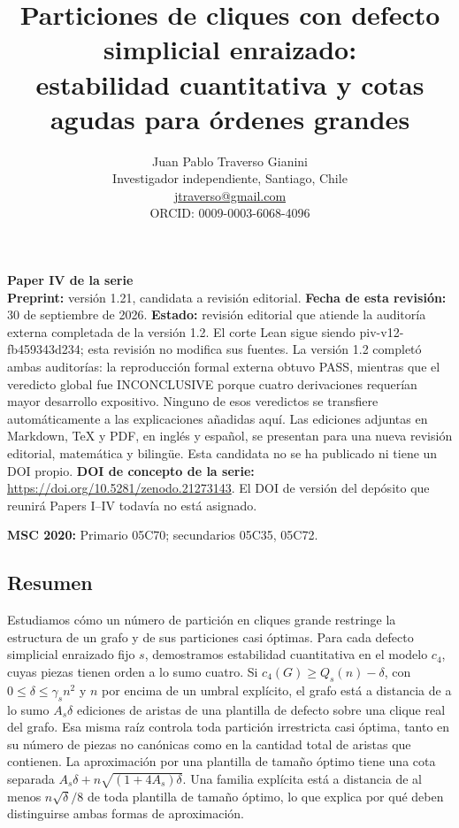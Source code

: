 \documentclass[spanish,11pt,a4paper]{article}
\title{Particiones de cliques con defecto simplicial enraizado:\\estabilidad cuantitativa y cotas agudas para órdenes grandes}
\author{Juan Pablo Traverso Gianini\\
\small Investigador independiente, Santiago, Chile\\
\small \href{mailto:jtraverso@gmail.com}{jtraverso@gmail.com}\\
\small ORCID: 0009-0003-6068-4096}
\date{}
\begin{document}
\raggedbottom
\maketitle
\textbf{Paper IV de la serie}\\
\textbf{Preprint:} versión 1.21, candidata a revisión editorial. \textbf{Fecha de esta revisión:} 30 de septiembre de 2026. \textbf{Estado:} revisión editorial que atiende la auditoría externa completada de la versión 1.2. El corte Lean sigue siendo {\ttfamily\small piv-\discretionary{\hbox{\ensuremath{\hookrightarrow}}}{}{}v12-\discretionary{\hbox{\ensuremath{\hookrightarrow}}}{}{}fb459343d234}; esta revisión no modifica sus fuentes. La versión 1.2 completó ambas auditorías: la reproducción formal externa obtuvo PASS, mientras que el veredicto global fue INCONCLUSIVE porque cuatro derivaciones requerían mayor desarrollo expositivo. Ninguno de esos veredictos se transfiere automáticamente a las explicaciones añadidas aquí. Las ediciones adjuntas en Markdown, TeX y PDF, en inglés y español, se presentan para una nueva revisión editorial, matemática y bilingüe. Esta candidata no se ha publicado ni tiene un DOI propio. \textbf{DOI de concepto de la serie:} \url{https://doi.org/10.5281/zenodo.21273143}. El DOI de versión del depósito que reunirá Papers I--IV todavía no está asignado.

\textbf{MSC 2020:} Primario 05C70; secundarios 05C35, 05C72.

\subsection{Resumen}\label{resumen}

Estudiamos cómo un número de partición en cliques grande restringe la estructura de un grafo y de sus particiones casi óptimas. Para cada defecto simplicial enraizado fijo \(s\), demostramos estabilidad cuantitativa en el modelo \(c_4\), cuyas piezas tienen orden a lo sumo cuatro. Si \(c_4(G)\ge Q_s(n)-\delta\), con \(0\le\delta\le\gamma_s n^2\) y \(n\) por encima de un umbral explícito, el grafo está a distancia de a lo sumo \(A_s\delta\) ediciones de aristas de una plantilla de defecto sobre una clique real del grafo. Esa misma raíz controla toda partición irrestricta casi óptima, tanto en su número de piezas no canónicas como en la cantidad total de aristas que contienen. La aproximación por una plantilla de tamaño óptimo tiene una cota separada \(A_s\delta+n\sqrt{(1+4A_s)\delta}\). Una familia explícita está a distancia de al menos \(n\sqrt{\delta}/8\) de toda plantilla de tamaño óptimo, lo que explica por qué deben distinguirse ambas formas de aproximación.
\end{document}
